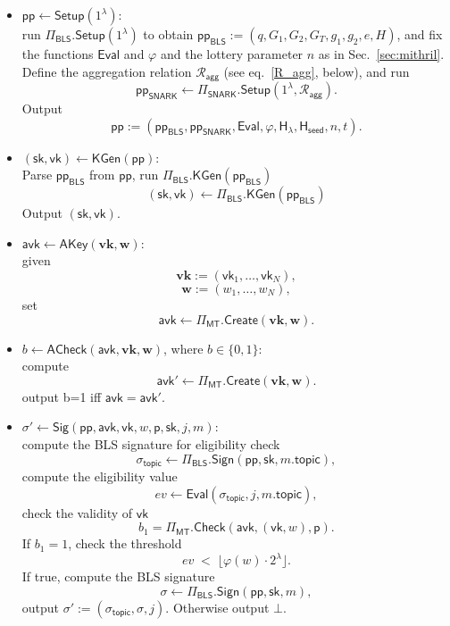 \documentclass{article}
\newcommand{\ppBLS}[0]{\mathsf{pp}_{\mathsf{BLS}}}
\newcommand{\ppSNARK}[0]{\mathsf{pp}_{\mathsf{SNARK}}}
\newcommand{\pp}[0]{\mathsf{pp}}
\newcommand{\sk}[0]{\mathsf{sk}}
\newcommand{\vk}[0]{\mathsf{vk}}
\newcommand{\avk}[0]{\mathsf{avk}}
\newcommand{\mkpth}[0]{\mathsf{p}}
\newcommand{\topic}[0]{\mathsf{topic}}
\begin{document}
\begin{itemize}

  \item $\pp \leftarrow \mathsf{Setup}(1^\lambda)$:\\
        run $\Pi_{\mathsf{BLS}}.\mathsf{Setup}(1^\lambda)$ to obtain $\ppBLS := (q,G_1,G_2,G_T,g_1,g_2,e,H)$, and fix the functions $\mathsf{Eval}$ and $\varphi$ and the lottery parameter $n$ as in Sec.~\ref{sec:mithril}. 
        Define the aggregation relation $\mathcal{R}_{\mathsf{agg}}$ (see eq.~\ref{R_agg}, below), and run
        \[
          \ppSNARK \leftarrow \Pi_{\mathsf{SNARK}}.\mathsf{Setup}(1^\lambda,\mathcal{R}_{\mathsf{agg}}).
        \]
        Output
        \[
          \pp := (\ppBLS,\ppSNARK,\mathsf{Eval},\varphi,\mathsf{H_\lambda},\mathsf{H_{seed}},n,t).
        \]
\item $(\sk,\vk) \leftarrow \mathsf{KGen}(\mathsf{pp})$:\\
        Parse $\ppBLS$ from $\pp$, run $\Pi_{\mathsf{BLS}}.\mathsf{KGen}(\ppBLS)$ 
        \[
          (\sk,\vk) \leftarrow \Pi_{\mathsf{BLS}}.\mathsf{KGen}(\ppBLS)
        \]
        Output $(\sk,\vk)$.

  \item $\mathsf{avk} \leftarrow \mathsf{AKey}(\mathbf{vk},\mathbf{w})$:\\
        given
        \[
          \mathbf{vk}:=(\vk_1,\dots,\vk_N),
        \]
        \[
          \mathbf{w}:=(w_1,\dots,w_N),
        \]
        set
        \[
          \mathsf{avk} \leftarrow \Pi_{\mathsf{MT}}.\mathsf{Create}(\mathbf{vk},\mathbf{w}).
        \]

  \item $b \leftarrow \mathsf{ACheck}(\mathsf{avk},\mathbf{vk},\mathbf{w})$, where $b\in\{0,1\}$:\\
        compute
        \[
          \mathsf{avk'} \leftarrow \Pi_{\mathsf{MT}}.\mathsf{Create}(\mathbf{vk},\mathbf{w}).
        \]
        output b=1 iff $\mathsf{avk}=\mathsf{avk'}$. 

  \item $\sigma' \leftarrow \mathsf{Sig}(\mathsf{pp}, \avk,\vk, w, \mkpth,\sk, j, m)$:\\
        compute the BLS signature for eligibility check
        \[
          \sigma_\topic \leftarrow \Pi_{\mathsf{BLS}}.\mathsf{Sign}(\mathsf{pp}, \sk, m.\topic),
        \]
        compute the eligibility value
        \[
          ev \leftarrow \mathsf{Eval}(\sigma_\topic, j, m.\topic),
        \]
        check the validity of $\vk$
        \[
            b_1 = \Pi_{\mathsf{MT}}.\mathsf{Check}(\avk,(\vk,w),\mkpth).
        \]
        If $b_1 = 1$, check the threshold 
        \[
          ev \;<\; \bigl\lfloor \varphi(w) \cdot 2^\lambda \bigr\rfloor.
        \]
        If true, compute the BLS signature
        \[
          \sigma \leftarrow \Pi_{\mathsf{BLS}}.\mathsf{Sign}(\mathsf{pp}, \sk, m),
        \]
        output $\sigma' := (\sigma_\topic, \sigma, j)$. Otherwise output $\bot$.


\end{itemize}
\end{document}
